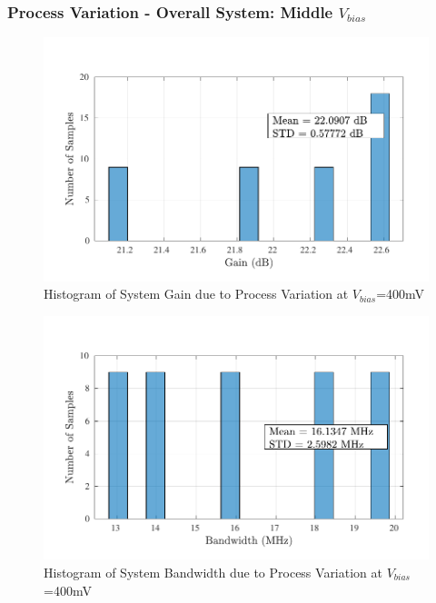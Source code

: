 \subsubsection{Process Variation - Overall System: Middle $V_{bias}$}
\begin{figure} [H]
\centering
\includegraphics[scale=1]{Figures/Corners/Overall/Proc_Mid/PDFs/Proc_Mid_gain.pdf}
\caption{Histogram of System Gain due to Process Variation at $V_{bias}$=400mV}
\end{figure}

\begin{figure} [H]
\centering
\includegraphics[scale=1]{Figures/Corners/Overall/Proc_Mid/PDFs/Proc_Mid_bw.pdf}
\caption{Histogram of System Bandwidth due to Process Variation at $V_{bias}$=400mV}
\end{figure}

